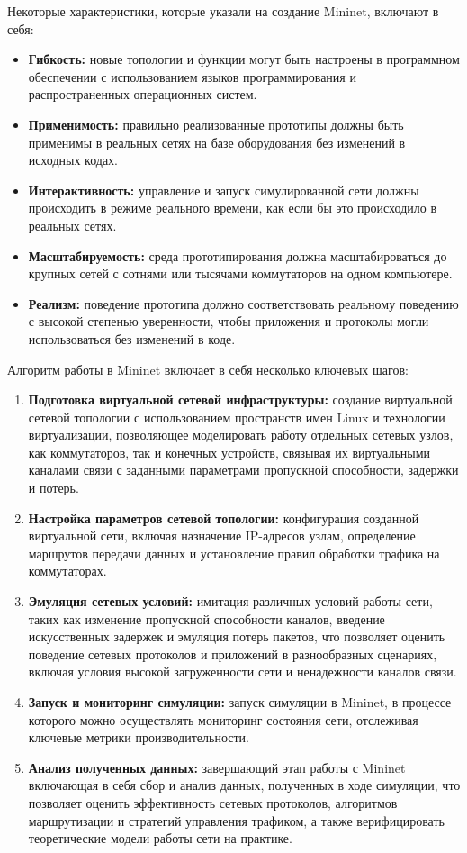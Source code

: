 Некоторые характеристики, которые указали на создание Mininet, включают в себя:

\begin{itemize}
  \item \textbf{Гибкость:} новые топологии и функции могут быть настроены в программном обеспечении с использованием языков программирования и распространенных операционных систем.
  
  \item \textbf{Применимость:} правильно реализованные прототипы должны быть применимы в реальных сетях на базе оборудования без изменений в исходных кодах.
  
  \item \textbf{Интерактивность:} управление и запуск симулированной сети должны происходить в режиме реального времени, как если бы это происходило в реальных сетях.
  
  \item \textbf{Масштабируемость:} среда прототипирования должна масштабироваться до крупных сетей с сотнями или тысячами коммутаторов на одном компьютере.
  
  \item \textbf{Реализм:} поведение прототипа должно соответствовать реальному поведению с высокой степенью уверенности, чтобы приложения и протоколы могли использоваться без изменений в коде.
\end{itemize}

Алгоритм работы в Mininet включает в себя несколько ключевых шагов:
\begin{enumerate}
\item \textbf{Подготовка виртуальной сетевой инфраструктуры:} создание виртуальной сетевой топологии с использованием пространств имен Linux и технологии виртуализации, позволяющее моделировать работу отдельных сетевых узлов, как коммутаторов, так и конечных устройств, связывая их виртуальными каналами связи с заданными параметрами пропускной способности, задержки и потерь.
\item \textbf{Настройка параметров сетевой топологии:} конфигурация созданной виртуальной сети, включая назначение IP-адресов узлам, определение маршрутов передачи данных и установление правил обработки трафика на коммутаторах.
\item \textbf{Эмуляция сетевых условий:} имитация различных условий работы сети, таких как изменение пропускной способности каналов, введение искусственных задержек и эмуляция потерь пакетов, что позволяет оценить поведение сетевых протоколов и приложений в разнообразных сценариях, включая условия высокой загруженности сети и ненадежности каналов связи.
\item \textbf{Запуск и мониторинг симуляции:} запуск симуляции в Mininet, в процессе которого можно осуществлять мониторинг состояния сети, отслеживая ключевые метрики производительности.
\item \textbf{Анализ полученных данных:} завершающий этап работы с Mininet включающая в себя сбор и анализ данных, полученных в ходе симуляции, что позволяет оценить эффективность сетевых протоколов, алгоритмов маршрутизации и стратегий управления трафиком, а также верифицировать теоретические модели работы сети на практике.
\end{enumerate}


